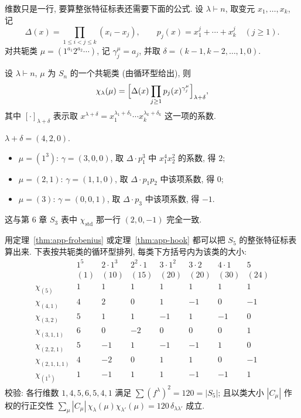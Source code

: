 维数只是一行, 要算整张特征标表还需要下面的公式. 设 $\lambda\vdash n$,
取变元 $x_1,\dots,x_k$, 记
\[
  \Delta(x)=\prod_{1\le i<j\le k}(x_i-x_j),\qquad
  p_j(x)=x_1^j+\cdots+x_k^j\quad(j\ge1).
\]
对共轭类 $\mu=(1^{a_1}2^{a_2}\cdots)$, 记 $\gamma^\mu_j=a_j$, 并取
$\delta=(k-1,k-2,\dots,1,0)$.

\begin{theorem}[Frobenius]\label{thm:app-frobenius}
设 $\lambda\vdash n$, $\mu$ 为 $S_n$ 的一个共轭类 (由循环型给出), 则
\[
  \chi_\lambda(\mu)=\Bigl[\Delta(x)\prod_{j\ge1}p_j(x)^{\gamma^\mu_j}\Bigr]_{\lambda+\delta},
\]
其中 $[\cdot]_{\lambda+\delta}$ 表示取 $x^{\lambda+\delta}=x_1^{\lambda_1+\delta_1}\cdots
x_k^{\lambda_k+\delta_k}$ 这一项的系数.
\end{theorem}

\begin{example}\label{eg:app-frobenius-S3}
$\lambda+\delta=(4,2,0)$.
\begin{itemize}
  \item $\mu=(1^3)$: $\gamma=(3,0,0)$, 取 $\Delta\cdot p_1^3$ 中 $x_1^4x_2^2$ 的系数, 得 $2$;
  \item $\mu=(2,1)$: $\gamma=(1,1,0)$, 取 $\Delta\cdot p_1p_2$ 中该项系数, 得 $0$;
  \item $\mu=(3)$: $\gamma=(0,0,1)$, 取 $\Delta\cdot p_3$ 中该项系数, 得 $-1$.
\end{itemize}
这与第 6 章 $S_3$ 表中 $\chi_{\mathrm{std}}$ 那一行 $(2,0,-1)$ 完全一致.
\end{example}

\begin{example}\label{eg:app-S5-table}
用定理~\ref{thm:app-frobenius} 或定理~\ref{thm:app-hook} 都可以把 $S_5$ 的整张特征标表算出来.
下表按共轭类的循环型排列, 每类下方括号内为该类的大小:
\[
\begin{array}{c|ccccccc}
  & 1^5 & 2\cdot1^3 & 2^2\cdot1 & 3\cdot1^2 & 3\cdot2 & 4\cdot1 & 5\\
  & (1) & (10) & (15) & (20) & (20) & (30) & (24)\\ \hline
  \chi_{(5)}      & 1 & 1 & 1 & 1 & 1 & 1 & 1\\
  \chi_{(4,1)}    & 4 & 2 & 0 & 1 & -1 & 0 & -1\\
  \chi_{(3,2)}    & 5 & 1 & 1 & -1 & 1 & -1 & 0\\
  \chi_{(3,1,1)}  & 6 & 0 & -2 & 0 & 0 & 0 & 1\\
  \chi_{(2,2,1)}  & 5 & -1 & 1 & -1 & -1 & 1 & 0\\
  \chi_{(2,1,1,1)}& 4 & -2 & 0 & 1 & 1 & 0 & -1\\
  \chi_{(1^5)}    & 1 & -1 & 1 & 1 & -1 & -1 & 1
\end{array}
\]
校验: 各行维数 $1,4,5,6,5,4,1$ 满足 $\sum(f^\lambda)^2=120=|S_5|$;
且以类大小 $|C_\mu|$ 作权的行正交性
$\sum_\mu|C_\mu|\,\chi_\lambda(\mu)\chi_{\lambda'}(\mu)=120\,\delta_{\lambda\lambda'}$ 成立.
\end{example}

